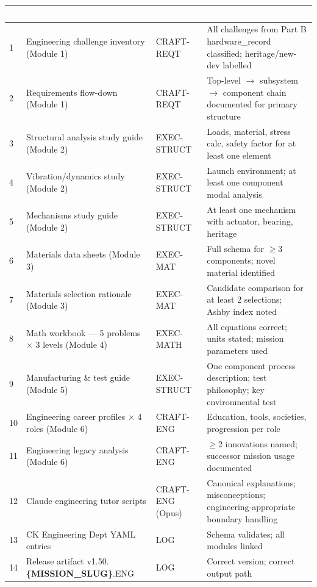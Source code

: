 \documentclass[11pt,letterpaper]{article}
\newcommand{\param}[1]{\textcolor{paramred}{\textbf{\{#1\}}}}
\newcommand{\tableheader}[1]{\textbf{\sffamily\textcolor{white}{#1}}}
\begin{document}
\begin{center}
\begin{tabularx}{\textwidth}{C{0.5cm}L{4.5cm}L{2.5cm}X}
\toprule
{}
\tableheader{\#} & \tableheader{Deliverable} & \tableheader{Agent} & \tableheader{Acceptance Criteria} \\
 & Engineering challenge inventory (Module 1) & CRAFT-REQT & All challenges from Part B hardware\_record classified; heritage/new-dev labelled \\
2 & Requirements flow-down (Module 1) & CRAFT-REQT & Top-level $\to$ subsystem $\to$ component chain documented for primary structure \\
3 & Structural analysis study guide (Module 2) & EXEC-STRUCT & Loads, material, stress calc, safety factor for at least one element \\
4 & Vibration/dynamics study (Module 2) & EXEC-STRUCT & Launch environment; at least one component modal analysis \\
5 & Mechanisms study guide (Module 2) & EXEC-STRUCT & At least one mechanism with actuator, bearing, heritage \\
6 & Materials data sheets (Module 3) & EXEC-MAT & Full schema for $\geq$3 components; novel material identified \\
7 & Materials selection rationale (Module 3) & EXEC-MAT & Candidate comparison for at least 2 selections; Ashby index noted \\
8 & Math workbook — 5 problems × 3 levels (Module 4) & EXEC-MATH & All equations correct; units stated; mission parameters used \\
9 & Manufacturing \& test guide (Module 5) & EXEC-STRUCT & One component process description; test philosophy; key environmental test \\
10 & Engineering career profiles × 4 roles (Module 6) & CRAFT-ENG & Education, tools, societies, progression per role \\
11 & Engineering legacy analysis (Module 6) & CRAFT-ENG & $\geq$2 innovations named; successor mission usage documented \\
12 & Claude engineering tutor scripts & CRAFT-ENG (Opus) & Canonical explanations; misconceptions; engineering-appropriate boundary handling \\
13 & CK Engineering Dept YAML entries & LOG & Schema validates; all modules linked \\
14 & Release artifact v1.50.\param{MISSION\_SLUG}.ENG & LOG & Correct version; correct output path \\
\bottomrule
\end{tabularx}
\end{center}
\end{document}
